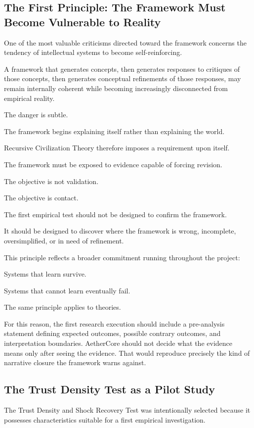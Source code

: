 \documentclass[12pt]{article}
\begin{document}
\subsection{The First Principle: The Framework Must Become Vulnerable to Reality}

One of the most valuable criticisms directed toward the framework concerns the tendency of intellectual systems to become self-reinforcing.

A framework that generates concepts, then generates responses to critiques of those concepts, then generates conceptual refinements of those responses, may remain internally coherent while becoming increasingly disconnected from empirical reality.

The danger is subtle.

The framework begins explaining itself rather than explaining the world.

Recursive Civilization Theory therefore imposes a requirement upon itself.

The framework must be exposed to evidence capable of forcing revision.

The objective is not validation.

The objective is contact.

The first empirical test should not be designed to confirm the framework.

It should be designed to discover where the framework is wrong, incomplete, oversimplified, or in need of refinement.

This principle reflects a broader commitment running throughout the project:

Systems that learn survive.

Systems that cannot learn eventually fail.

The same principle applies to theories.

For this reason, the first research execution should include a pre-analysis statement defining expected outcomes, possible contrary outcomes, and interpretation boundaries. AetherCore should not decide what the evidence means only after seeing the evidence. That would reproduce precisely the kind of narrative closure the framework warns against.

\subsection{The Trust Density Test as a Pilot Study}

The Trust Density and Shock Recovery Test was intentionally selected because it possesses characteristics suitable for a first empirical investigation.
\end{document}
